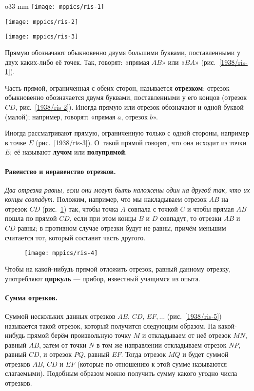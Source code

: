 \begin{wrapfigure}{o}{33 mm}
\vskip-2mm
\centering
\texttt{[image: mppics/ris-1]}
\caption{}\label{1938/ris-1}
\bigskip
\texttt{[image: mppics/ris-2]}
\caption{}\label{1938/ris-2}
\bigskip
\texttt{[image: mppics/ris-3]}
\caption{}\label{1938/ris-3}
\end{wrapfigure}

Прямую обозначают обыкновенно двумя большими буквами, поставленными у двух каких-либо её точек.
Так, говорят:
«прямая $AB$» или «$BA$» (рис.~\ref{1938/ris-1}).

Часть прямой, ограниченная с обеих сторон, называется \textbf{отрезком};
отрезок обыкновенно обозначается двумя буквами, поставленными у его концов (отрезок $CD$, рис.~\ref{1938/ris-2}).
Иногда прямую или отрезок обозначают и одной буквой (малой);
например, говорят: «прямая $a$, отрезок $b$».

Иногда рассматривают прямую, ограниченную только с одной стороны, например в точке $E$ (рис.~\ref{1938/ris-3}).
О~такой прямой говорят, что она исходит из точки $E$;
её называют \textbf{лучом} или \textbf{полупрямой}. 

\paragraph{Равенство и неравенство отрезков.}\label{1938/6}
\emph{Два отрезка равны, если они могут быть наложены один на другой так, что их концы совпадут.}
Положим, например, что мы накладываем отрезок $AB$ на
отрезок $CD$ (рис.~\ref{1938/ris-4}) так, чтобы точка $A$ совпала с точкой $C$ и чтобы прямая $AB$ пошла по прямой $CD$, если при этом концы $B$ и $D$ совпадут, то отрезки $AB$ и $CD$ равны;
в противном случае отрезки будут не равны, причём меньшим считается тот, который составит часть другого.


\begin{figure}[h!]
\centering
\texttt{[image: mppics/ris-4]}
\caption{}\label{1938/ris-4}
\end{figure}


Чтобы на какой-нибудь прямой отложить отрезок, равный данному отрезку, употребляют \textbf{циркуль} — прибор, известный учащимся из опыта.

\paragraph{Сумма отрезков.}\label{1938/7}
Суммой нескольких данных отрезков $AB$, $CD$, $EF,\dots$
(рис.~\ref{1938/ris-5}) называется такой отрезок, который получится следующим образом.
На какой-нибудь прямой берём произвольную точку $M$ и откладываем от неё отрезок $MN$, равный $AB$, затем от точки $N$ в том же направлении откладываем отрезок $NP$, равный $CD$, и отрезок $PQ$, равный $EF$.
Тогда отрезок $MQ$ и будет суммой отрезков $AB$, $CD$ и $EF$ (которые по отношению к этой сумме называются слагаемыми).
Подобным образом можно получить сумму какого угодно числа отрезков.

